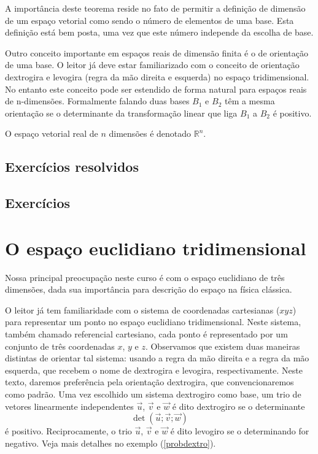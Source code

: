 A importância deste teorema reside no fato de permitir a definição de dimensão de um espaço vetorial como sendo o número de elementos de uma base. Esta definição está bem posta, uma vez que este número independe da escolha de base.

Outro conceito importante em espaços reais de dimensão finita é o de orientação de uma base. O leitor já deve estar familiarizado com o conceito de orientação dextrogira e levogira (regra da mão direita e esquerda) no espaço tridimensional. No entanto este conceito pode ser estendido de forma natural para espaços reais de n-dimensões. Formalmente falando duas bases $B_1$ e $B_2$ têm a mesma orientação se o determinante da transformação linear que liga $B_1$ a $B_2$ é positivo.    

O espaço vetorial real de $n$ dimensões é denotado $\mathbb{R}^n$. 

\subsection*{Exercícios resolvidos}

\construirExeresol

\subsection*{Exercícios}

\construirExer


\section{O espaço euclidiano tridimensional}
Nossa principal preocupação neste curso é com o espaço euclidiano de três dimensões, dada sua importância para descrição do espaço na física clássica.  
 
O leitor já tem familiaridade com o sistema de coordenadas cartesianas ($xyz$) para representar um ponto no espaço euclidiano tridimensional. Neste sistema, também chamado referencial cartesiano, cada ponto é representado por um conjunto de três coordenadas $x$, $y$ e $z$. Observamos que existem duas maneiras distintas de orientar tal sistema: usando a regra da mão direita e a regra da mão esquerda, que recebem o nome de dextrogira e levogira, respectivamente. Neste texto, daremos preferência pela orientação dextrogira, que convencionaremos como padrão. Uma vez escolhido um sistema dextrogiro como base,  um trio de vetores linearmente independentes $\vec{u}$, $\vec{v}$ e  $\vec{w}$ é dito dextrogiro se o determinante 
\begin{equation}\label{defdextro}
\det\left(\vec{u};\vec{v};\vec{w}\right)
\end{equation}   
é positivo. Reciprocamente, o trio  $\vec{u}$, $\vec{v}$ e  $\vec{w}$ é dito levogiro se o determinando for negativo. Veja mais detalhes no exemplo (\ref{probdextro}).

